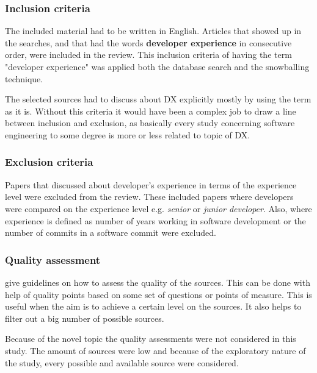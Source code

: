 \documentclass[english, 12pt, a4paper, sci, utf8, a-1b, online]{aaltothesis}
\begin{document}

\subsubsection{Inclusion criteria}

The included material had to be written in English. Articles that showed up in the searches, and that had the words \textbf{developer experience} in consecutive order, were included in the review. This inclusion criteria of having the term "developer experience" was applied both the database search and the snowballing technique.

The selected sources had to discuss about DX explicitly mostly by using the term as it is. Without this criteria it would have been a complex job to draw a line between inclusion and exclusion, as basically every study concerning software engineering to some degree is more or less related to topic of DX.

\subsubsection{Exclusion criteria}

Papers that discussed about developer's experience in terms of the experience level were excluded from the review. These included papers where developers were compared on the experience level e.g. \textit{senior} or \textit{junior developer}. Also, where experience is defined as number of years working in software development or the number of commits in a software commit were excluded.


\subsubsection{Quality assessment}

\cite{guidelines-for-MLR} give guidelines on how to assess the quality of the sources. This can be done with help of quality points based on some set of questions or points of measure. This is useful when the aim is to achieve a certain level on the sources. It also helps to filter out a big number of possible sources.

Because of the novel topic the quality assessments were not considered in this study. The amount of sources were low and because of the exploratory nature of the study, every possible and available source were considered.
\end{document}
